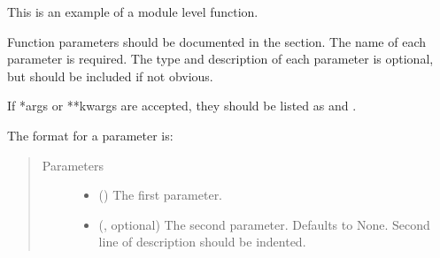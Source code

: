 \documentclass[letterpaper,10pt,english]{sphinxmanual}
\begin{document}
\begin{fulllineitems}
\label{\detokenize{source/example:example.module_level_function}}
\pysigstartsignatures
{}
\pysigstopsignatures
\sphinxAtStartPar
This is an example of a module level function.

\sphinxAtStartPar
Function parameters should be documented in the  section. The name
of each parameter is required. The type and description of each parameter
is optional, but should be included if not obvious.

\sphinxAtStartPar
If *args or **kwargs are accepted,
they should be listed as  and .

\sphinxAtStartPar
The format for a parameter is:

\begin{sphinxVerbatim}[commandchars=\\\{\}]
  
          
           

         
\end{sphinxVerbatim}
\begin{quote}\begin{description}
\item[{Parameters}] \leavevmode\begin{itemize}
\item {} 
\sphinxAtStartPar
{} () \textendash{} The first parameter.

\item {} 
\sphinxAtStartPar
{} (, optional) \textendash{} The second parameter. Defaults to None.
Second line of description should be indented.


\end{itemize}
\end{description}
\end{quote}
\end{fulllineitems}
\end{document}
